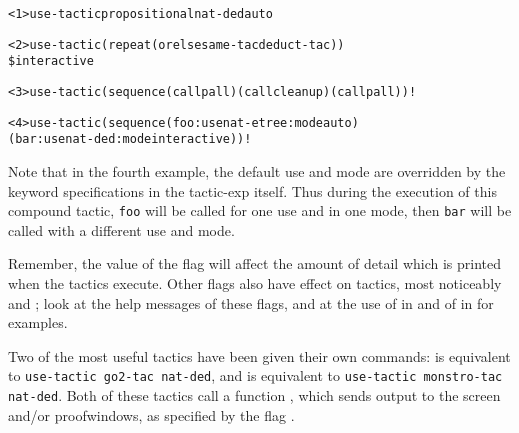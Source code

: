 \begin{alltt}
<1> use-tactic propositional nat-ded auto

<2> use-tactic (repeat (orelse same-tac deduct-tac))
               \$ interactive

<3> use-tactic (sequence (call pall) (call cleanup) (call pall)) !

<4> use-tactic (sequence (foo :use nat-etree :mode auto)
                         (bar :use nat-ded :mode interactive)) !
\end{alltt}
Note that in the fourth example, the default use and mode are overridden
by the keyword specifications in the tactic-exp itself.  Thus during the
execution of this compound tactic, {\tt foo} will be called for one use and
in one mode, then {\tt bar} will be called with a different use and mode.

Remember, the value of the flag   will
affect the amount of detail which is printed when the tactics execute.
Other flags also have effect on tactics, most noticeably 
and ; look at the help messages of these flags, and at
the use of  in 
and of  in  for examples.

Two of the most useful tactics have been given their own commands:
 is equivalent to {\tt use-tactic go2-tac nat-ded}, and
 is equivalent to {\tt use-tactic monstro-tac nat-ded}.
Both of these tactics call a function , which
sends output to the screen and/or proofwindows, as specified by the flag
.

